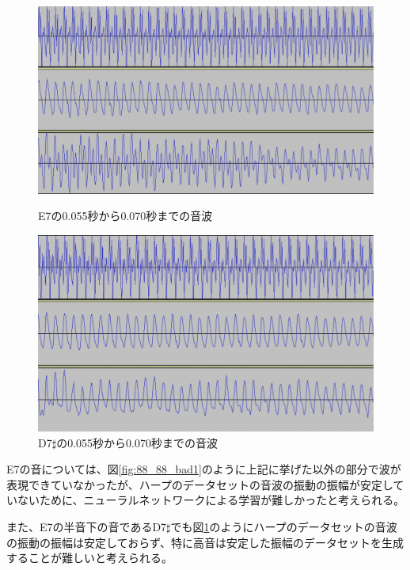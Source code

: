 \begin{description}
\begin{figure}[t]
\begin{center}
\begin{minipage}{0.48\hsize}
\begin{center}
\includegraphics[width=0.9\hsize]{figure/88_88_det/e7_0550_0700.png}
\caption{E7の0.055秒から0.070秒までの音波}
\label{fig:88_88_bad1}
\end{center}
\end{minipage}
\begin{minipage}{0.48\hsize}
\begin{center}
\includegraphics[width=0.9\hsize]{figure/88_88_det/d7s_0550_0700.png}
\caption{D7$\sharp$の0.055秒から0.070秒までの音波}
\label{fig:88_88_bad2}
\end{center}
\end{minipage}
\end{center}
\end{figure}

E7の音については、図\ref{fig:88_88_bad1}のように上記に挙げた以外の部分で波が表現できていなかったが、ハープのデータセットの音波の振動の振幅が安定していないために、ニューラルネットワークによる学習が難しかったと考えられる。

また、E7の半音下の音であるD7$\sharp$でも図\ref{fig:88_88_bad2}のようにハープのデータセットの音波の振動の振幅は安定しておらず、特に高音は安定した振幅のデータセットを生成することが難しいと考えられる。

\end{description}


